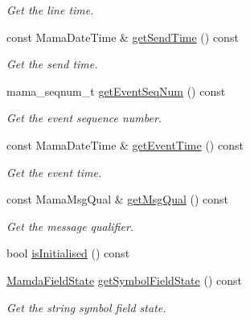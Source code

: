 \begin{CompactItemize}
\begin{CompactList}\small\item\em Get the line time. \item\end{CompactList}\item 
const Mama\-Date\-Time \& \hyperlink{classWombat_1_1MamdaAuctionListener_8258accabbd79b1ab817055b83aff153}{get\-Send\-Time} () const 
\begin{CompactList}\small\item\em Get the send time. \item\end{CompactList}\item 
mama\_\-seqnum\_\-t \hyperlink{classWombat_1_1MamdaAuctionListener_22c842018863f4240872c7f7eb193b98}{get\-Event\-Seq\-Num} () const 
\begin{CompactList}\small\item\em Get the event sequence number. \item\end{CompactList}\item 
const Mama\-Date\-Time \& \hyperlink{classWombat_1_1MamdaAuctionListener_677e3629c44bbf21a134c1fb490658f8}{get\-Event\-Time} () const 
\begin{CompactList}\small\item\em Get the event time. \item\end{CompactList}\item 
const Mama\-Msg\-Qual \& \hyperlink{classWombat_1_1MamdaAuctionListener_6bb4128d50574f643efa39dc8edcd9cc}{get\-Msg\-Qual} () const 
\begin{CompactList}\small\item\em Get the message qualifier. \item\end{CompactList}\item 
bool \hyperlink{classWombat_1_1MamdaAuctionListener_a6c080b83b8b26d2cbc5f95d3800076f}{is\-Initialised} () const 
\item 
\hyperlink{namespaceWombat_93aac974f2ab713554fd12a1fa3b7d2a}{Mamda\-Field\-State} \hyperlink{classWombat_1_1MamdaAuctionListener_d8ba0fa1c6fc027fe676cd72ec17007a}{get\-Symbol\-Field\-State} () const 
\begin{CompactList}\small\item\em Get the string symbol field state. \item\end{CompactList}\item 

\end{CompactItemize}
